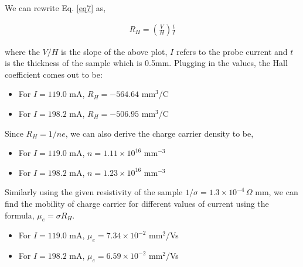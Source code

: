 We can rewrite Eq. \ref{eq7} as,

\begin{align} \label{eq9}
    R_H = \left(\frac{V}{H}\right)\frac{t}{I}
\end{align}

where the $V/H$ is the slope of the above plot, $I$ refers to the probe current and $t$ is the thickness of the sample which is 0.5mm. Plugging in the values, the Hall coefficient comes out to be:

\begin{itemize}
    \item For $I=119.0$ mA, $R_H = -564.64 $ mm$^3$/C
    \item For $I=198.2$ mA, $R_H = -506.95 $ mm$^3$/C
\end{itemize}

\noindent Since $R_H=1/ne$, we can also derive the charge carrier density to be,

\begin{itemize}
    \item For $I=119.0$ mA, $n = 1.11 \times 10^{16} $ mm$^{-3}$
    \item For $I=198.2$ mA, $n = 1.23 \times 10^{16} $ mm$^{-3}$
\end{itemize}

\noindent Similarly using the given resistivity of the sample $1/\sigma=1.3 \times 10^{-4}\,\Omega$ mm, we can find
the mobility of charge carrier for different values of current using the formula, $\mu_e=\sigma R_H$.

\begin{itemize}
    \item For $I=119.0$ mA, $\mu_e = 7.34 \times 10^{-2} $ mm$^{2}$/Vs
    \item For $I=198.2$ mA, $\mu_e = 6.59 \times 10^{-2} $ mm$^{2}$/Vs
\end{itemize} \vspace{-1em}